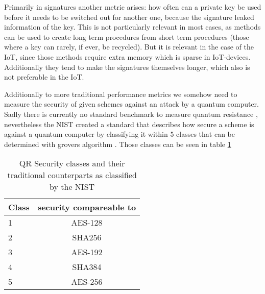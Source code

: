 \documentclass[conference]{IEEEtran}
\begin{document}
Primarily in signatures another metric arises: how often can a private key be used before it needs to be switched out for another one, because the signature leaked information of the key.
This is not particularly relevant in most cases, as methods can be used to create long term procedures from short term procedures (those where a key can rarely, if ever, be recycled).
But it is relevant in the case of the IoT, since those methods require extra memory which is sparse in IoT-devices. Additionally they tend to make the signatures themselves longer, which also is not preferable in the IoT. \cite{QR_algs}

Additionally to more traditional performance metrics we somehow need to measure the security of given schemes against an attack by a quantum computer.
Sadly there is currently no standard benchmark to measure quantum resistance \cite{QR_comparison}, nevertheless the NIST created a standard that describes how secure a scheme is against a quantum computer by classifying it within 5 classes that can be determined with grovers algorithm \cite{QR_Iot_Lattice,Energy_comp}.
Those classes can be seen in table \ref{QR-classes}

\begin{table}
    \label{QR-classes}
    \centering
    \caption{QR Security classes and their traditional counterparts as classified by the NIST}
    \begin{tabular}{l | c}
        Class & security compareable to \\
        \hline
        1 & AES-128 \\
        2 & SHA256 \\
        3 & AES-192 \\
        4 & SHA384 \\
        5 & AES-256 \\
    \end{tabular} 
\end{table}
\end{document}
